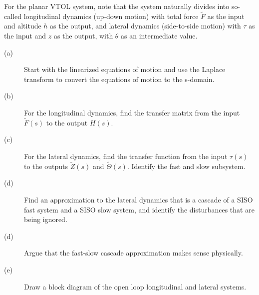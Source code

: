 For the planar VTOL system, note that the system naturally divides into so-called longitudinal dynamics (up-down motion) with total force $\tilde{F}$ as the input and altitude $h$ as the output, and lateral dynamics (side-to-side motion) with $\tau$ as the input and $z$ as the output, with $\theta$ as an intermediate value.

  \begin{description}
    \item[(a)] Start with the linearized equations of motion and use the Laplace transform to convert the equations of motion to the s-domain. 
    \item[(b)] For the longitudinal dynamics, find the transfer matrix from the input $\tilde{F}(s)$ to the output $H(s)$.
    \item[(c)] For the lateral dynamics, find the transfer function from the input $\tau(s)$ to the outputs $\tilde{Z}(s)$ and $\tilde{\Theta}(s)$.  Identify the fast and slow subsystem.
    \item[(d)] Find an approximation to the lateral dynamics that is a cascade of a SISO fast system and a SISO slow system, and identify the disturbances that are being ignored.
    \item[(d)] Argue that the fast-slow cascade approximation makes sense physically.
    \item[(e)] Draw a block diagram of the open loop longitudinal and lateral systems.
  \end{description}

